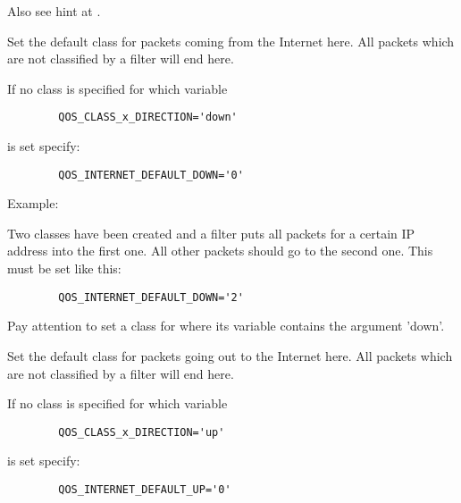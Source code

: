 \begin{description}
   Also see hint at .



   Set the default class for packets coming from the Internet here. All packets
   which are not classified by a filter will end here.

   If no class is specified for which variable
\begin{example}
\begin{verbatim}
        QOS_CLASS_x_DIRECTION='down'
\end{verbatim}
\end{example}
   is set specify:
\begin{example}
\begin{verbatim}
        QOS_INTERNET_DEFAULT_DOWN='0'
\end{verbatim}
\end{example}

   Example:

   Two classes have been created and a filter puts all packets for a certain
   IP address into the first one. All other packets should go to the second one.
   This must be set like this:

\begin{example}
\begin{verbatim}
        QOS_INTERNET_DEFAULT_DOWN='2'
\end{verbatim}
\end{example}

   Pay attention to set a class for  where
   its  variable contains the argument 'down'.



   Set the default class for packets going out to the Internet here. All packets
   which are not classified by a filter will end here.

   If no class is specified for which variable
\begin{example}
\begin{verbatim}
        QOS_CLASS_x_DIRECTION='up'
\end{verbatim}
\end{example}

is set specify:
\begin{example}
\begin{verbatim}
        QOS_INTERNET_DEFAULT_UP='0'
\end{verbatim}
\end{example}


\end{description}
